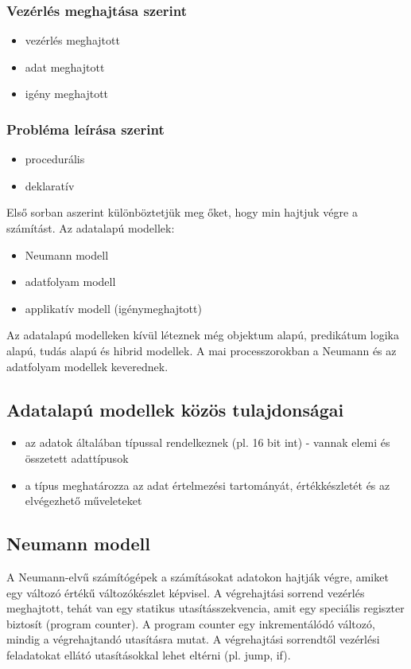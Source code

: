 \subsubsection{Vezérlés meghajtása szerint}
\begin{itemize}
    \item vezérlés meghajtott
    \item adat meghajtott
    \item igény meghajtott
\end{itemize}

\subsubsection{Probléma leírása szerint}
\begin{itemize}
    \item procedurális
    \item deklaratív
\end{itemize}

Első sorban aszerint különböztetjük meg őket, hogy min hajtjuk végre a számítást.
Az adatalapú modellek:
\begin{itemize}
    \item Neumann modell
    \item adatfolyam modell
    \item applikatív modell (igénymeghajtott)
\end{itemize}
Az adatalapú modelleken kívül léteznek még objektum alapú, predikátum logika alapú, tudás alapú és hibrid modellek.
A mai processzorokban a Neumann és az adatfolyam modellek keverednek.

\subsection{Adatalapú modellek közös tulajdonságai}
\begin{itemize}
    \item az adatok általában típussal rendelkeznek (pl. 16 bit int) - vannak elemi és összetett adattípusok
    \item a típus meghatározza az adat értelmezési tartományát, értékkészletét és az elvégezhető műveleteket
\end{itemize}

\subsection{Neumann modell}
A Neumann-elvű számítógépek a számításokat adatokon hajtják végre, amiket egy változó értékű változókészlet képvisel.
A végrehajtási sorrend vezérlés meghajtott, tehát van egy statikus utasításszekvencia, amit egy speciális regiszter biztosít (program counter).
A program counter egy inkrementálódó változó, mindig a végrehajtandó utasításra mutat.
A végrehajtási sorrendtől vezérlési feladatokat ellátó utasításokkal lehet eltérni (pl. jump, if).

